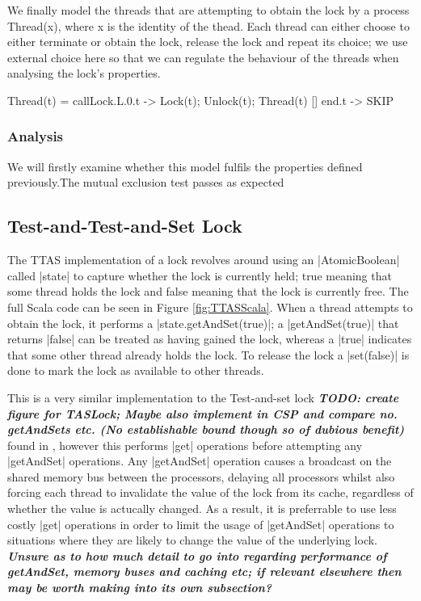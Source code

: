 We finally model the threads that are attempting to obtain the lock by a process Thread(x), where x is the identity of the thead. Each thread can either choose to either terminate or obtain the lock, release the lock and repeat its choice; we use external choice here so that we can regulate the  behaviour of the threads when analysing the lock's properties.

\begin{cspm}
  Thread(t) = callLock.L.0.t -> Lock(t); Unlock(t); Thread(t)
              [] end.t -> SKIP
\end{cspm}

\subsubsection{Analysis}

We will firstly examine whether this model fulfils the properties defined previously.The mutual exclusion test passes as expected



\subsection{Test-and-Test-and-Set Lock}

The TTAS implementation of a lock revolves around using an |AtomicBoolean| called |state| to capture whether the lock is currently held; true meaning that some thread holds the lock and false meaning that the lock is currently free. The full Scala code can be seen in Figure \ref{fig:TTASScala}. When a thread attempts to obtain the lock, it performs a |state.getAndSet(true)|; a |getAndSet(true)| that returns |false| can be treated as having gained the lock, whereas a |true| indicates that some other thread already holds the lock. To release the lock a |set(false)| is done to mark the lock as available to other threads.

This is a very similar implementation to the Test-and-set lock \textbf{\emph{TODO: create figure for TASLock; Maybe also implement in CSP and compare no. getAndSets etc. (No establishable bound though so of dubious benefit)}} found in \cite{TAoMP}, however this performs |get| operations before attempting any |getAndSet| operations. Any |getAndSet| operation causes a broadcast on the shared memory bus between the processors, delaying all processors whilst also forcing each thread to invalidate the value of the lock from its cache, regardless of whether the value is actucally changed. As a result, it is preferrable to use less costly |get| operations in order to limit the usage of |getAndSet| operations to situations where they are likely to change the value of the underlying lock. \textbf{\emph{Unsure as to how much detail to go into regarding performance of getAndSet, memory buses and caching etc; if relevant elsewhere then may be worth making into its own subsection?}}

